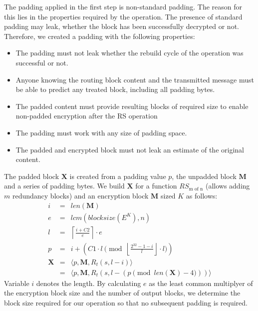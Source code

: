 The padding applied in the first step is non-standard padding. The reason for this lies in the properties required by the operation. The presence of standard padding may leak, whether the block has been successfully decrypted or not. Therefore, we created a padding with the following properties:
\begin{itemize}
	\item The padding must not leak whether the rebuild cycle of the operation was successful or not.
	\item Anyone knowing the routing block content and the transmitted message must be able to predict any treated block, including all padding bytes.
	\item The padded content must provide resulting blocks of required size to enable non-padded encryption after the RS operation
	\item The padding must work with any size of padding space.
	\item The padded and encrypted block must not leak an estimate of the original content.
\end{itemize}

The padded block $\mathbf{X}$ is created from a padding value $p$, the unpadded block $\mathbf{M}$ and a series of padding bytes. We build $\mathbf{X}$ for a function $RS_{\text{m of n}}$ (allows adding $m$ redundancy blocks) and an encryption block $\mathbf{M}$ sized $K$ as follows:
\begin{eqnarray}
i          & = & len(\mathbf{M}) \label{eqn:sizeOrigMsg}\\
e          & = & lcm\left(blocksize\left(E^{K}\right), n\right) \label{eqn:sizeOfOpBlock}\\
l          & = & \left\lceil\frac{i + C2 }{e}\right\rceil\cdot e \label{eqn:sizeOfPaddedBlock}\\
p          & = & i + \left( C1 \cdot l \pmod{\left\lfloor\frac{2^{32}-1-i}{l}\right\rfloor\cdot l}\right)\\
\mathbf{X} & = & \langle p,\mathbf{M},R_{t}\left(s,l-i\right)\rangle\\\nonumber
           & = & \langle p,\mathbf{M},R_{t}\left(s,l-\left(p \pmod{len\left(\mathbf{X}\right)-4}\right)\right)\rangle
\end{eqnarray}    
Variable $i$ denotes the length. By calculating $e$ as the least common multiplyer of the encryption block size and the number of output blocks, we determine the block size required for our operation so that no subsequent padding is required.

